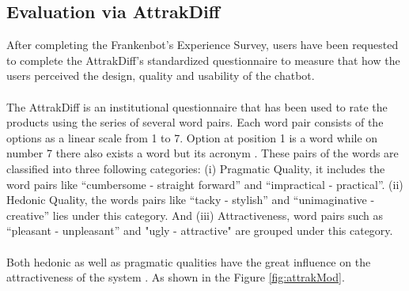 \subsection{Evaluation via AttrakDiff}
After completing the Frankenbot's Experience Survey, users have been requested to complete the AttrakDiff's standardized questionnaire to measure that how the users perceived the design, quality and usability of the chatbot.
\\~\\
The AttrakDiff is an institutional questionnaire that has been used to rate the products using the series of several word pairs. Each word pair consists of the options as a linear scale from 1 to 7. Option at position 1 is a word while on number 7 there also exists a word but its acronym \cite{attrakdiffQuest}. These pairs of the words are classified into three following categories: (i) Pragmatic Quality, it includes the word pairs like “cumbersome - straight forward” and “impractical - practical”. (ii) Hedonic Quality, the words pairs like “tacky - stylish” and “unimaginative - creative” lies under this category. And (iii) Attractiveness, word pairs such as “pleasant - unpleasant” and "ugly - attractive" are grouped under this category. \cite{alex}
\\~\\
Both hedonic as well as pragmatic qualities have the great influence on the attractiveness of the system \cite{inflOfHedandPrag}. As shown in the Figure \ref{fig:attrakMod}.

